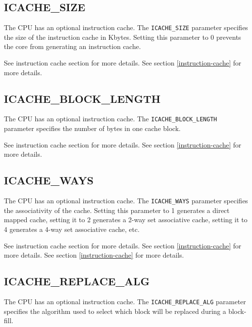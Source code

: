 \subsection{ICACHE\_SIZE}\label{icache_size}

The CPU has an optional instruction cache. The \texttt{ICACHE\_SIZE} parameter
specifies the size of the instruction cache in Kbytes. Setting this
parameter to 0 prevents the core from generating an instruction cache.

\ifdefined\MARKDOWN
See instruction cache section for more details.
\else
See section \ref{instruction-cache}  for more details.
\fi


\subsection{ICACHE\_BLOCK\_LENGTH}\label{icache_block_length}

The CPU has an optional instruction cache. The \texttt{ICACHE\_BLOCK\_LENGTH}
parameter specifies the number of bytes in one cache block.

\ifdefined\MARKDOWN
See instruction cache section for more details.
\else
See section \ref{instruction-cache}  for more details.
\fi

\subsection{ICACHE\_WAYS}\label{icache_ways}

The CPU has an optional instruction cache. The \texttt{ICACHE\_WAYS} parameter
specifies the associativity of the cache. Setting this parameter to 1
generates a direct mapped cache, setting it to 2 generates a 2-way set
associative cache, setting it to 4 generates a 4-way set associative
cache, etc.

\ifdefined\MARKDOWN
See instruction cache section for more details.
\else
See section \ref{instruction-cache}  for more details.
\fi
See section \ref{instruction-cache}  for more details.

\subsection{ICACHE\_REPLACE\_ALG}\label{icache_replace_alg}

The CPU has an optional instruction cache. The \texttt{ICACHE\_REPLACE\_ALG}
parameter specifies the algorithm used to select which block will be
replaced during a block-fill.

